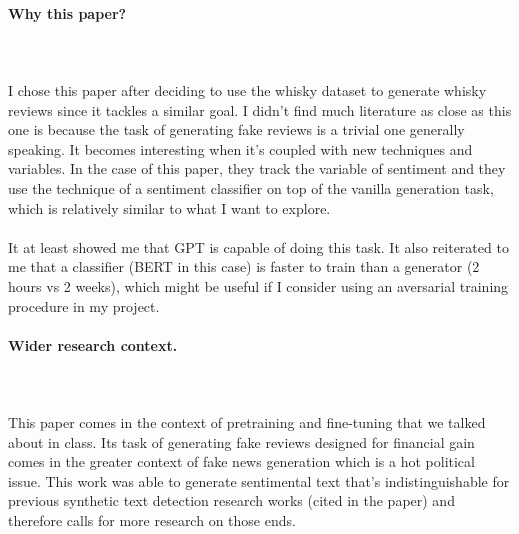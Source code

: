 \documentclass{article}
\begin{document}
\paragraph{Why this paper?}$ $
\\\\I chose this paper after deciding to use the whisky dataset to generate whisky reviews since it tackles a similar goal.  I didn't find much literature as close as this one is because the task of generating fake reviews is a trivial one generally speaking. It becomes interesting when it's coupled with new techniques and variables. In the case of this paper, they track the variable of sentiment and they use the technique of a sentiment classifier on top of the vanilla generation task, which is relatively similar to what I want to explore. 
\\\\ It at least showed me that GPT is capable of doing this task. It also reiterated to me that a classifier (BERT in this case) is faster to train than a generator (2 hours vs 2 weeks), which might be useful if I consider using an aversarial training procedure in my project.
\paragraph{Wider research context.}$ $
\\\\This paper comes in the context of pretraining and fine-tuning that we talked about in class.  Its task of generating fake reviews designed for financial gain comes in the greater context of fake news generation which is a hot political issue.  This work was able to generate sentimental text that's indistinguishable for previous synthetic text detection research works (cited in the paper) and therefore calls for more research on those ends. 
\end{document}
